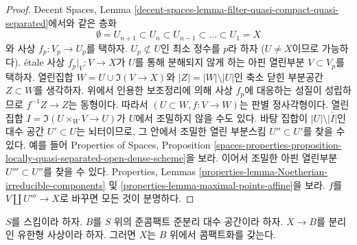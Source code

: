 \begin{proof}
Decent Spaces, Lemma
\ref{decent-spaces-lemma-filter-quasi-compact-quasi-separated}에서와 같은
층화
$$
\emptyset = U_{n + 1} \subset
U_n \subset U_{n - 1} \subset \ldots \subset U_1 = X
$$
와 사상 $f_p : V_p \to U_p$를 택하자.
$U_p \not \subset U$인 최소 정수를 $p$라 하자
($U \not = X$이므로 가능하다).
\'etale 사상 $f_p|_V : V \to X$가 $U$를 통해 분해되지 않게 하는
아핀 열린부분 $V \subset V_p$를 택하자.
열린집합 $W = U \cup \Im(V \to X)$와
$|Z| = |W| \setminus |U|$인 축소 닫힌 부분공간 $Z \subset W$를
생각하자.
위에서 인용한 보조정리에 의해 사상 $f_p$에 대응하는 성질이
성립하므로 $f^{-1}Z \to Z$는 동형이다.
따라서 $(U \subset W, f : V \to W)$는 판별 정사각형이다.
열린집합 $I = \Im(U \times_W V \to U)$가 $U$에서 조밀하지 않을
수도 있다. 바탕 집합이 $|U| \setminus \overline{|I|}$인
대수 공간 $U' \subset U$는 뇌터이므로, 그 안에서 조밀한 열린
부분스킴 $U'' \subset U'$를 찾을 수 있다. 예를 들어 Properties of
Spaces, Proposition
\ref{spaces-properties-proposition-locally-quasi-separated-open-dense-scheme}을
보라. 이어서 조밀한 아핀 열린부분 $U''' \subset U''$를 찾을 수 있다.
Properties, Lemmas
\ref{properties-lemma-Noetherian-irreducible-components} 및
\ref{properties-lemma-maximal-points-affine}을 보라.
$f$를 $V \amalg U''' \to X$로 바꾸면 모든 것이 분명하다.
\end{proof}

\begin{theorem}
\label{theorem-nagata}
\begin{reference}
\cite{CLO}
\end{reference}
$S$를 스킴이라 하자. $B$를 $S$ 위의 준콤팩트 준분리 대수 공간이라
하자. $X \to B$를 분리인 유한형 사상이라 하자.
그러면 $X$는 $B$ 위에서 콤팩트화를 갖는다.
\end{theorem}

